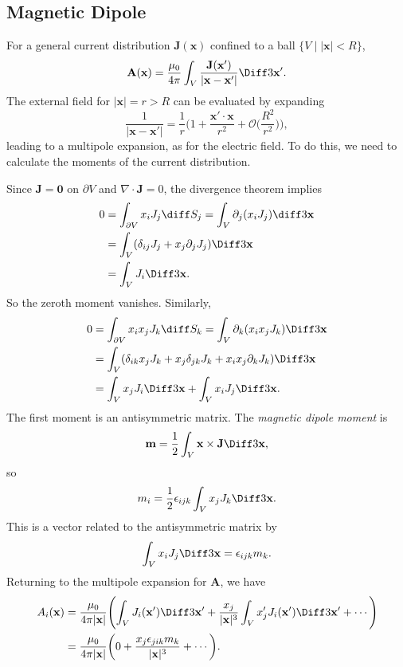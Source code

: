 \documentclass[12pt]{article}
\begin{document}
\subsection{Magnetic Dipole}
\label{sub:magnetic_dipole}

For a general current distribution $\mathbf{J}(\mathbf{x})$ confined to a ball $\{V \mid |\mathbf{x}| < R\}$,
\[
\mathbf{A}(\mathbf{x}) = \frac{\mu_0}{4 \pi} \int_{V} \frac{\mathbf{J}(\mathbf{x'})}{|\mathbf{x} - \mathbf{x}'|} \Diff3 \mathbf{x}'
.\]
The external field for $|\mathbf{x}| = r > R$ can be evaluated by expanding
\[
\frac{1}{|\mathbf{x} - \mathbf{x}'|} = \frac{1}{r} \biggl( 1 + \frac{\mathbf{x}' \cdot \mathbf{x}}{r^2} + \mathcal{O}\biggl(\frac{R^2}{r^2} \biggr) \biggr)
,\]
leading to a multipole expansion, as for the electric field. To do this, we need to calculate the moments of the current distribution.

Since $\mathbf{J} = \mathbf{0}$ on $\partial V$ and $\nabla \cdot \mathbf{J} = 0$, the divergence theorem implies
\begin{align*}
	0 &= \int_{\partial V} x_i J_j \diff S_j = \int_{V} \partial_j (x_i J_j) \diff3 \mathbf{x} \\
	  &= \int_{V} (\delta_{ij} J_j + x_j \partial_j J_j) \Diff3 \mathbf{x} \\
	  &= \int_{V} J_i \Diff3 \mathbf{x}
.\end{align*}
So the zeroth moment vanishes. Similarly,
\begin{align*}
	0 &= \int_{\partial V} x_i x_j J_k \diff S_k = \int_{V} \partial_k (x_i x_j J_k) \Diff3 \mathbf{x} \\
	  &= \int_{V}(\delta_{ik} x_j J_k + x_j \delta_{jk} J_k + x_i x_j \partial_k J_k) \Diff3 \mathbf{x} \\
	  &= \int_{V} x_j J_i \Diff3 \mathbf{x} + \int_{V} x_i J_j \Diff3 \mathbf{x}.
\end{align*}
The first moment is an antisymmetric matrix. The \emph{magnetic dipole moment} is
\[
	\mathbf{m} = \frac{1}{2} \int_{V} \mathbf{x} \times \mathbf{J} \Diff3 \mathbf{x}
,\]
so
\[
m_i = \frac{1}{2} \epsilon_{ijk} \int_{V} x_j J_k \Diff3 \mathbf{x}
.\]
This is a vector related to the antisymmetric matrix by
\[
\int_{V} x_i J_j \Diff3 \mathbf{x} = \epsilon_{ijk} m_k
.\]
Returning to the multipole expansion for $\mathbf{A}$, we have
\begin{align*}
	A_i(\mathbf{x}) &= \frac{\mu_0}{4 \pi |\mathbf{x}|} \Biggl( \int_{V} J_i(\mathbf{x}') \Diff3 \mathbf{x}'+ \frac{x_j}{|\mathbf{x}|^3} \int_{V} x_j' J_i(\mathbf{x}') \Diff3 \mathbf{x}' + \cdots \Biggr) \\
	&= \frac{\mu_0}{4 \pi|\mathbf{x}|} \biggl( 0 + \frac{x_j \epsilon_{jik} m_k}{|\mathbf{x}|^3} + \cdots \biggr).
\end{align*}
\end{document}
